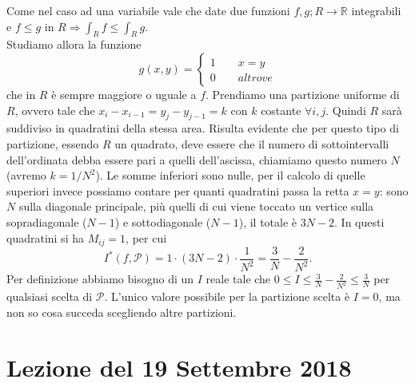 \documentclass[10pt]{article}
\theoremstyle{plain}
\theoremstyle{definition}
\begin{document}
Come nel caso ad una variabile vale che date due funzioni $f,g;R\to \mathbb{R}$ integrabili e $f\leq g$ in $R\Rightarrow \int_Rf\leq \int_Rg$. 
\\ Studiamo allora la funzione 
\begin{equation}
  g(x,y)=
   \begin{cases}
   1\qquad x=y\\0 \qquad altrove
   \end{cases}
\end{equation}
che in $R$ è sempre maggiore o uguale a $f$. Prendiamo una partizione uniforme di $R$, ovvero tale che $x_i-x_{i-1}=y_j-y_{j-1}=k$ con $k$ costante $\forall i,j$. Quindi $R$ sarà suddiviso in quadratini della stessa area. Risulta evidente che per questo tipo di partizione, essendo $R$ un quadrato, deve essere che il numero di sottointervalli dell'ordinata debba essere pari a quelli dell'ascissa, chiamiamo questo numero $N$ (avremo $k=1/N^2$). Le somme inferiori sono nulle, per il calcolo di quelle superiori invece possiamo contare per quanti quadratini passa la retta $x=y$: sono $N$ sulla diagonale principale, più quelli di cui viene toccato un vertice sulla sopradiagonale ($N-1$) e sottodiagonale ($N-1$), il totale è $3N-2$. In questi quadratini si ha $M_{ij}=1$, per cui $$I^*(f,\mathcal{P})=1\cdot (3N-2)\cdot \frac{1}{N^2}=\frac{3}{N}-\frac{2}{N^2}.$$ 
 Per definizione abbiamo bisogno di un $I$ reale tale che $0\leq I\leq \frac{3}{N}-\frac{2}{N^2} \leq \frac{3}{N}$ per qualsiasi scelta di $\mathcal{P}$. L'unico valore possibile per la partizione scelta è $I=0$, ma non so cosa succeda scegliendo altre partizioni.
 
 \section{Lezione del 19 Settembre 2018}
\end{document}
